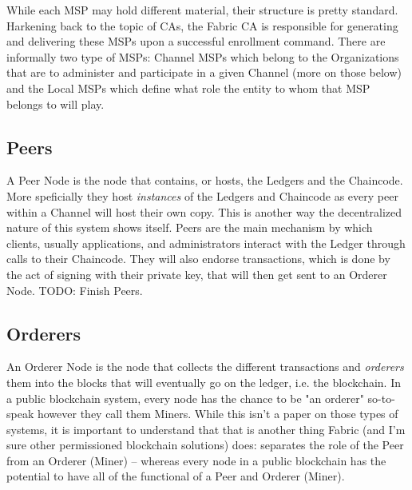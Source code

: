 		
		
		\hspace{10mm}While each MSP may hold different material, their structure is pretty standard. Harkening back to the topic of CAs, the Fabric CA is responsible for generating and delivering these MSPs upon a successful enrollment command. There are informally two type of MSPs: Channel MSPs which belong to the Organizations that are to administer and participate in a given Channel (more on those below) and the Local MSPs which define what role the entity to whom that MSP belongs to will play.\\
		
	\subsection{Peers}
		\hspace{10mm}A Peer Node is the node that contains, or hosts, the Ledgers and the Chaincode. More speficially they host \textit{instances} of the Ledgers and Chaincode as every peer within a Channel will host their own copy. This is another way the decentralized nature of this system shows itself. Peers are the main mechanism by which clients, usually applications, and administrators interact with the Ledger through calls to their Chaincode. They will also endorse transactions, which is done by the act of signing with their private key, that will then get sent to an Orderer Node. TODO: Finish Peers.\\	
		
	\subsection{Orderers}
		\hspace{10mm}An Orderer Node is the node that collects the different transactions and \textit{orderers} them into the blocks that will eventually go on the ledger, i.e. the blockchain. In a public blockchain system, every node has the chance to be "an orderer" so-to-speak however they call them Miners. While this isn't a paper on those types of systems, it is important to understand that that is another thing Fabric (and I'm sure other permissioned blockchain solutions) does: separates the role of the Peer from an Orderer (Miner) -- whereas every node in a public blockchain has the potential to have all of the functional of a Peer and Orderer (Miner).\\
		

